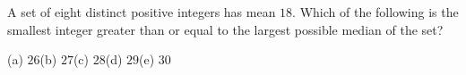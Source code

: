 A set of eight distinct positive integers has mean $18$. Which of the following is the smallest integer greater than or equal to the largest possible median of the set?

(a) $26$\quad (b) $27$\quad (c) $28$\quad (d) $29$\quad (e) $30$
